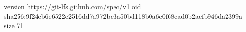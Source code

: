 version https://git-lfs.github.com/spec/v1
oid sha256:9f24eb6e6522e2516dd7a972bc3a50bd118b0a6e0f68cad0b2acfb946da2399a
size 71
